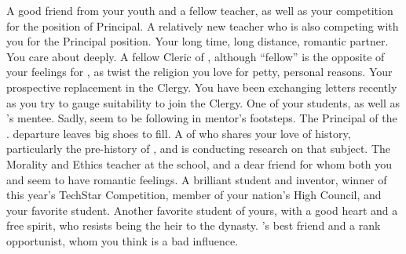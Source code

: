 \documentclass[char]{GL2020}
\begin{document}
\begin{contacts}
    \contact{\cMusic{}} A good friend from your youth and a fellow teacher, as well as your competition for the position of Principal.
    \contact{\cChupSecond{}} A relatively new teacher who is also competing with you for the Principal position. 
    \contact{\cJuniorStatesman{}} Your long time, long distance, romantic partner. You care about \cJuniorStatesman{\them} deeply.
    \contact{\cAntiChup{}} A fellow Cleric of \cTechGod{}, although ``fellow'' is the opposite of your feelings for \cAntiChup{\them}, as \cAntiChup{\they} twist\cAntiChup{\verbs} the religion you love for petty, personal reasons.
    \contact{\cHeadScientist{}} Your prospective replacement in the Clergy. You have been exchanging letters recently as you try to gauge \cHeadScientist{\their} suitability to join the Clergy.
    \contact{\cScholarship{}} One of your students, as well as \cAntiChup{}'s mentee. Sadly, \cScholarship{\they} seem\cScholarship{\verbs} to be following in \cScholarship{\their} mentor's footsteps.
    \contact{\cPrincipal{}} The Principal of the \pSchool{}. \cPrincipal{\Their} departure leaves big shoes to fill.
    \contact{\cEbbPriest{}} A \cEbbPriest{\cleric} of \cEbb{} who shares your love of history, particularly the pre-history of \pEarth{}, and is conducting research on that subject.
    \contact{\cEthics{}} The Morality and Ethics teacher at the school, and a dear friend for whom both you and \cJuniorStatesman{} seem to have romantic feelings.     
    \contact{\cTechStar{}} A brilliant student and inventor, winner of this year's TechStar Competition, member of your nation's High Council, and your favorite student. 
    \contact{\cHeir{}} Another favorite student of yours, with a good heart and a free spirit, who resists being the heir to the \cHeir{\formal} dynasty. 
    \contact{\cAmbition{}} \cHeir{}’s best friend and a rank opportunist, whom you think is a bad influence.
\end{contacts}
\end{document}
